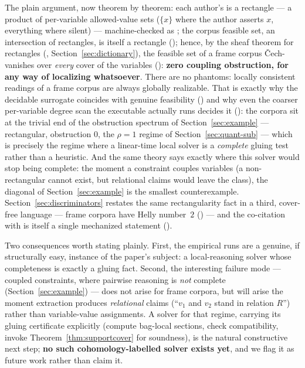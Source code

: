 \documentclass[11pt]{article}
\newcommand{\rectrho}{\rho}
\begin{document}
The plain argument, now theorem by theorem: each author's
 is a rectangle --- a product of per-variable
allowed-value sets ($\{x\}$ where the author asserts $x$, everything
where silent) --- machine-checked as
; the corpus feasible set, an
intersection of rectangles, is itself a rectangle
(); hence, by the sheaf
theorem for rectangles (,
Section~\ref{sec:dictionary}), the feasible set of a frame corpus
\v{C}ech-vanishes over \emph{every} cover of the variables
(): \textbf{zero coupling obstruction,
for any way of localizing whatsoever}.  There are no phantoms:
locally consistent readings of a frame corpus are always globally
realizable.  That is exactly why the decidable surrogate
 coincides with genuine feasibility
() and why even the coarser
per-variable degree scan the executable actually runs decides it
(): the
corpora sit at the trivial end of the obstruction spectrum of
Section~\ref{sec:example} --- rectangular, obstruction $0$, the
$\rectrho = 1$ regime of Section~\ref{sec:quant-sub} --- which is
precisely the regime where a linear-time local solver is a
\emph{complete} gluing test rather than a heuristic.  And the same
theory says exactly where this solver would stop being complete: the
moment a constraint couples variables (a non-rectangular
 cannot exist, but relational claims would
leave the class), the diagonal of Section~\ref{sec:example} is the
smallest counterexample.  Section~\ref{sec:discriminators} restates
the same rectangularity fact in a third, cover-free language ---
frame corpora have Helly number~$2$ () ---
and the co-citation with  is itself a
single mechanized statement
().

Two consequences worth stating plainly.  First, the empirical runs
are a genuine, if structurally easy, instance of the paper's subject:
a local-reasoning solver whose completeness is exactly a gluing fact.
Second, the interesting failure mode --- coupled constraints, where
pairwise reasoning is \emph{not} complete
(Section~\ref{sec:example}) --- does not arise for frame corpora, but
will arise the moment extraction produces \emph{relational} claims
(``$v_1$ and $v_2$ stand in relation $R$'') rather than
variable-value assignments.  A solver for that regime, carrying its
gluing certificate explicitly (compute bag-local sections, check
compatibility, invoke Theorem~\ref{thm:supportcover} for
soundness), is the natural constructive next step; \textbf{no such
cohomology-labelled solver exists yet}, and we flag it as future
work rather than claim it.
\end{document}
